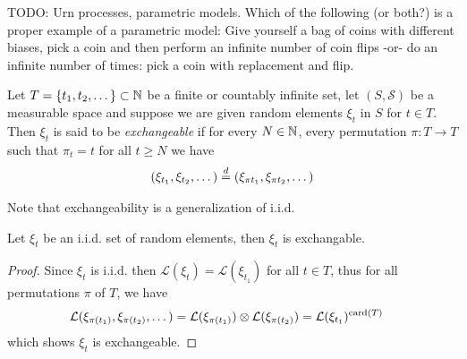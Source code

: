 TODO: Urn processes, parametric models.  Which of the following (or both?) is a proper example of a 
parametric model: Give yourself a bag of coins with different biases, pick a coin and then perform an 
infinite number of coin flips -or- do an infinite number of times: pick a coin with replacement and flip.

\begin{defn}Let $T = \lbrace t_1, t_2, \dotsc \rbrace \subset \mathbb{N}$ be a finite or countably infinite set, let $(S, \mathcal{S})$ be a measurable space and suppose we are given random elements $\xi_t$ in $S$ for $t \in T$.  Then $\xi_t$ is said to be \emph{exchangeable} if for every $N \in \mathbb{N}$, every permutation $\pi : T \to T$ such that $\pi_t = t$ for all $t \geq N$ we have
\begin{align*}
(\xi_{t_1}, \xi_{t_2}, \dotsc) \overset{d}= (\xi_{\pi t_1}, \xi_{\pi t_2}, \dotsc) 
\end{align*}
\end{defn}

Note that exchangeability is a generalization of i.i.d.
\begin{prop}Let $\xi_t$ be an i.i.d. set of random elements, then $\xi_t$ is exchangable.
\end{prop}
\begin{proof}
Since $\xi_t$ is i.i.d. then $\mathcal{L}(\xi_t)=\mathcal{L}(\xi_{t_1})$ for all $t \in T$, thus for all permutations $\pi$ of $T$, we have
\begin{align*}
\mathcal{L}(\xi_{\pi (t_1)}, \xi_{\pi( t_2)}, \dotsc) &= 
\mathcal{L}(\xi_{\pi (t_1)}) \otimes \mathcal{L}(\xi_{\pi( t_2)}) = 
\mathcal{L}(\xi_{t_1})^{\operatorname*{card}(T)}
\end{align*}
which shows $\xi_t$ is exchangeable.
\end{proof}

